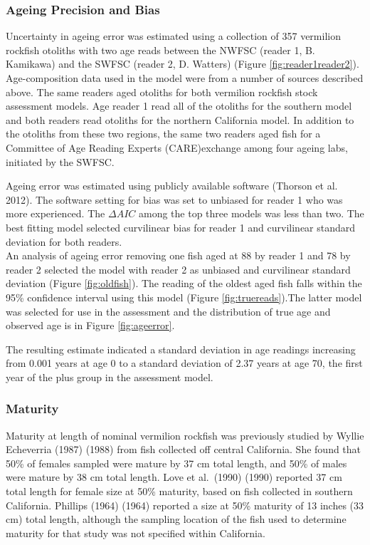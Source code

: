 \documentclass[
  english,
  a4paper,
]{article}
\begin{document}
\hypertarget{ageing-precision-and-bias}{%
\subsubsection{Ageing Precision and Bias}\label{ageing-precision-and-bias}}

Uncertainty in ageing error was estimated using a collection of 357 vermilion rockfish
otoliths with two age reads between the NWFSC (reader 1, B. Kamikawa) and the
SWFSC (reader 2, D. Watters) (Figure \ref{fig:reader1reader2}).
Age-composition data used in the model were from a number of sources described
above. The same readers aged otoliths for both vermilion rockfish stock assessment models.
Age reader 1 read all of the otoliths for the southern model and both readers read
otoliths for the northern California model. In addition to the otoliths from these
two regions, the same two readers aged fish for a Committee of Age Reading Experts
(CARE)exchange among four ageing labs, initiated by the SWFSC.

Ageing error was estimated using publicly available software (Thorson et al. 2012).
The software setting for bias was set to unbiased for reader 1 who was more
experienced. The \(\Delta AIC\) among the top three models was less than two. The
best fitting model selected curvilinear bias for reader 1 and curvilinear standard
deviation for both readers.\\
An analysis of ageing error removing one fish aged at 88 by reader 1 and 78 by reader 2
selected the model with reader 2 as unbiased and curvilinear standard deviation
(Figure \ref{fig:oldfish}). The reading of the oldest aged fish falls within the 95\% confidence
interval using this model (Figure \ref{fig:truereads}).The latter model was selected
for use in the assessment and the distribution of true age and observed
age is in Figure \ref{fig:ageerror}.

The resulting estimate indicated a standard deviation in age readings
increasing from 0.001 years at age 0 to a standard deviation of 2.37 years at age 70,
the first year of the plus group in the assessment model.

\hypertarget{maturity}{%
\subsubsection{Maturity}\label{maturity}}

Maturity at length of nominal vermilion rockfish was previously studied by Wyllie Echeverria (1987) (1988) from fish collected off central California. She found that 50\% of females sampled were mature by 37 cm total length, and 50\% of males were mature by 38 cm total length. Love et al.~(1990) (1990) reported 37 cm total length for female size at 50\% maturity, based on fish collected in southern California. Phillips (1964) (1964) reported a size at 50\% maturity of 13 inches (33 cm) total length, although the sampling location of the fish used to determine maturity for that study was not specified within California.
\end{document}
